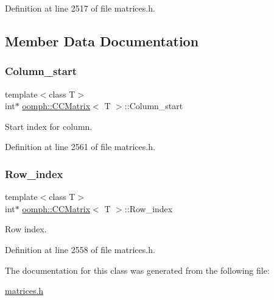 Definition at line 2517 of file matrices.\+h.



\subsection{Member Data Documentation}
\mbox{\label{classoomph_1_1CCMatrix_a6a38ae2bd1a69905375585d5b24c6136}} 
\subsubsection{\texorpdfstring{Column\+\_\+start}{Column\_start}}
{\footnotesize\ttfamily template$<$class T$>$ \\
int$\ast$ \hyperlink{classoomph_1_1CCMatrix}{oomph\+::\+C\+C\+Matrix}$<$ T $>$\+::Column\+\_\+start\hspace{0.3cm}{\ttfamily [protected]}}



Start index for column. 



Definition at line 2561 of file matrices.\+h.

\mbox{\label{classoomph_1_1CCMatrix_a7dba85934f3059d0163dda06f94ddf9b}} 
\subsubsection{\texorpdfstring{Row\+\_\+index}{Row\_index}}
{\footnotesize\ttfamily template$<$class T$>$ \\
int$\ast$ \hyperlink{classoomph_1_1CCMatrix}{oomph\+::\+C\+C\+Matrix}$<$ T $>$\+::Row\+\_\+index\hspace{0.3cm}{\ttfamily [protected]}}



Row index. 



Definition at line 2558 of file matrices.\+h.



The documentation for this class was generated from the following file\+:\begin{DoxyCompactItemize}
\item 
\hyperlink{matrices_8h}{matrices.\+h}\end{DoxyCompactItemize}
